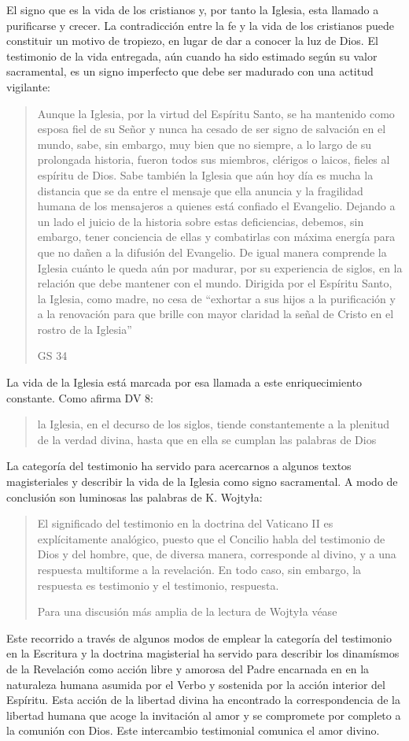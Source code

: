 El signo que es la vida de los cristianos y, por tanto la Iglesia, esta llamado
a purificarse y crecer. La contradicción entre la fe y la vida de los cristianos
puede constituir un motivo de tropiezo, en lugar de dar a conocer la luz de
Dios. El testimonio de la vida entregada, aún cuando ha sido estimado según su
valor sacramental, es un signo imperfecto que debe ser madurado con una actitud
vigilante:
\blockquote[GS 34]{Aunque la Iglesia, por la virtud del Espíritu Santo, se ha
  mantenido como esposa fiel de su Señor y nunca ha cesado de ser signo de
  salvación en el mundo, sabe, sin embargo, muy bien que no siempre, a lo largo
  de su prolongada historia, fueron todos sus miembros, clérigos o laicos,
  fieles al espíritu de Dios. Sabe también la Iglesia que aún hoy día es mucha
  la distancia que se da entre el mensaje que ella anuncia y la fragilidad
  humana de los mensajeros a quienes está confiado el Evangelio. Dejando a un
  lado el juicio de la historia sobre estas deficiencias, debemos, sin embargo,
  tener conciencia de ellas y combatirlas con máxima energía para que no dañen a
  la difusión del Evangelio. De igual manera comprende la Iglesia cuánto le
  queda aún por madurar, por su experiencia de siglos, en la relación que debe
  mantener con el mundo. Dirigida por el Espíritu Santo, la Iglesia, como madre,
  no cesa de ``exhortar a sus hijos a la purificación y a la renovación para que
  brille con mayor claridad la señal de Cristo en el rostro de la Iglesia''}.

La vida de la Iglesia está marcada por esa llamada a este enriquecimiento
constante. Como afirma DV 8: \blockquote{la Iglesia, en el decurso de los
  siglos, tiende constantemente a la plenitud de la verdad divina, hasta que en
  ella se cumplan las palabras de Dios}.

La categoría del testimonio ha servido para acercarnos a algunos textos
magisteriales y describir la vida de la Iglesia como signo sacramental. A modo
de conclusión son luminosas las palabras de K. Wojtyła:
\blockquote[Para una discusión más amplia de la lectura de Wojtyła véase
{\cite[194--197]{prades2015testimonio}}]{El significado del testimonio en la
  doctrina del Vaticano II es explícitamente analógico, puesto que el Concilio
  habla del testimonio de Dios y del hombre, que, de diversa manera, corresponde
  al divino, y a una respuesta multiforme a la revelación. En todo caso, sin
  embargo, la respuesta es testimonio y el testimonio, respuesta.}

Este recorrido a través de algunos modos de emplear la categoría del testimonio
en la Escritura y la doctrina magisterial ha servido para describir los
dinamísmos de la Revelación como acción libre y amorosa del Padre encarnada en
en la naturaleza humana asumida por el Verbo y sostenida por la acción interior
del Espíritu. Esta acción de la libertad divina ha encontrado la correspondencia
de la libertad humana que acoge la invitación al amor y se compromete por
completo a la comunión con Dios. Este intercambio testimonial comunica el amor
divino.
